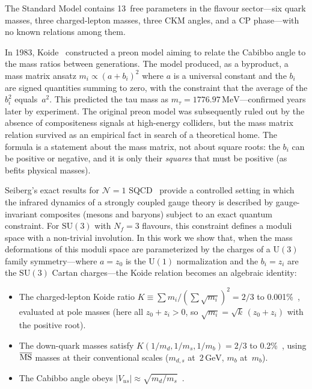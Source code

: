\documentclass[12pt,a4paper]{article}
\newcommand{\SU}{\mathrm{SU}}
\newcommand{\UU}{\mathrm{U}}
\newcommand{\Nf}{N_f}
\newcommand{\MeV}{\,\mathrm{MeV}}
\newcommand{\GeV}{\,\mathrm{GeV}}
\begin{document}
The Standard Model contains 13~free parameters in the flavour
sector---six quark masses, three charged-lepton masses, three CKM
angles, and a CP phase---with no known relations among them.

In 1983, Koide~\cite{Koide:1983qe} constructed a preon model
aiming to relate the Cabibbo angle to the mass ratios between
generations. The model produced, as a byproduct, a mass matrix
ansatz $m_i \propto (a + b_i)^2$ where $a$ is a universal constant
and the $b_i$ are signed quantities summing to zero, with the
constraint that the average of the $b_i^2$ equals~$a^2$.
This predicted the tau mass as $m_\tau = 1776.97\MeV$---confirmed
years later by experiment. The original preon model was subsequently
ruled out by the absence of compositeness signals at high-energy
colliders, but the mass matrix relation survived as an empirical
fact in search of a theoretical home.
The formula is a statement about the mass matrix, not about
square roots: the $b_i$ can be positive or negative, and it is
only their \emph{squares} that must be positive (as befits
physical masses).

Seiberg's exact results for $\mathcal{N}=1$
SQCD~\cite{Seiberg:1994bz,Intriligator:1995au} provide a
controlled setting in which the infrared dynamics of a strongly coupled
gauge theory is described by gauge-invariant composites (mesons and
baryons) subject to an exact quantum constraint. For $\SU(3)$ with
$\Nf=3$ flavours, this constraint defines a moduli space with a
non-trivial involution. In this work we show that, when the mass
deformations of this moduli space are parameterized by the charges of a
$\UU(3)$ family symmetry---where $a = z_0$ is the $\UU(1)$
normalization and the $b_i = z_i$ are the $\SU(3)$ Cartan
charges---the Koide relation becomes an algebraic identity:
\begin{itemize}
  \item The charged-lepton Koide ratio $K \equiv \sum m_i / (\sum
    \sqrt{m_i})^2 = 2/3$ to 0.001\%~\cite{Koide:1983qe},
    evaluated at pole masses (here all $z_0 + z_i > 0$, so
    $\sqrt{m_i} = \sqrt{k}\,(z_0{+}z_i)$ with the positive root).
  \item The down-quark masses satisfy $K(1/m_d, 1/m_s, 1/m_b) = 2/3$
    to 0.2\%~\cite{Rivero:2024epjc}, using
    $\overline{\rm MS}$ masses at their conventional scales
    ($m_{d,s}$ at~$2\GeV$, $m_b$ at~$m_b$).
  \item The Cabibbo angle obeys $|V_{us}| \approx
    \sqrt{m_d/m_s}$~\cite{GattoSartoriTonin:1968,Weinberg:1977hb,Fritzsch:1979zq}.
\end{itemize}
\end{document}
